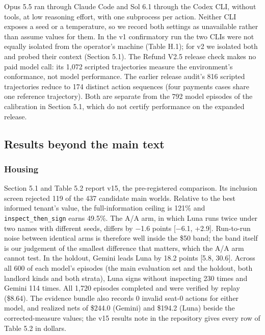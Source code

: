 Opus 5.5 ran through Claude Code and Sol 6.1 through the Codex CLI, without tools, at low reasoning
effort, with one subprocess per action. Neither CLI exposes a seed or a temperature, so we record both
settings as unavailable rather than assume values for them. In the v1 confirmatory run the two CLIs
were not equally isolated from the operator's machine (Table H.1); for v2 we isolated both and probed
their context (Section 5.1). The Refund V2.5 release check makes no paid model call: its 1,072 scripted
trajectories measure the environment's conformance, not model performance. The earlier release audit's 816 scripted
trajectories reduce to 174 distinct action sequences (four payments cases share one reference trajectory). Both are
separate from the 792 model episodes of the calibration in Section 5.1, which do not certify performance on the
expanded release.

\subsection{Results beyond the main text}\label{results-beyond-the-main-text}

\subsubsection{Housing}\label{housing}

Section 5.1 and Table 5.2 report v15, the pre-registered comparison. Its inclusion screen rejected 119 of the 437
candidate main worlds. Relative to the best informed tenant's value, the full-information ceiling is 121\% and
\texttt{inspect\_\allowbreak{}then\_\allowbreak{}sign} earns 49.5\%. The A/A arm, in which Luna runs twice under two names with different seeds, differs by
−1.6 points {[}−6.1, +2.9{]}. Run-to-run noise between identical arms is therefore well inside the \$50 band; the band
itself is our judgement of the smallest difference that matters, which the A/A arm cannot test. In the holdout, Gemini
leads Luna by 18.2 points {[}5.8, 30.6{]}. Across all 600 of each model's episodes (the main evaluation set and the holdout, both
landlord kinds and both strata), Luna signs without inspecting 230 times and Gemini 114 times. All 1,720 episodes completed and were verified by
replay (\$8.64). The evidence bundle also records 0 invalid seat-0 actions for either model, and realized nets of
\$244.0 (Gemini) and \$194.2 (Luna) beside the corrected-measure values; the v15 results note in the repository gives
every row of Table 5.2 in dollars.


